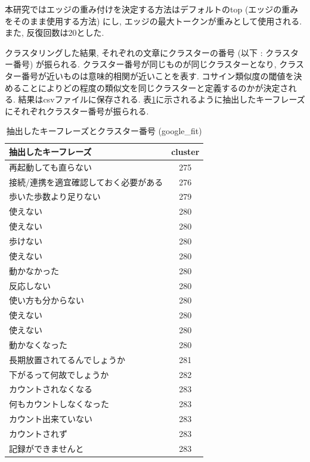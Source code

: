 本研究ではエッジの重み付けを決定する方法はデフォルトのtop (エッジの重みをそのまま使用する方法) にし, エッジの最大トークンが重みとして使用される. また, 反復回数は20とした. 

クラスタリングした結果, それぞれの文章にクラスターの番号 (以下 : クラスター番号) が振られる. クラスター番号が同じものが同じクラスターとなり, クラスター番号が近いものは意味的相関が近いことを表す. コサイン類似度の閾値を決めることによりどの程度の類似文を同じクラスターと定義するのかが決定される. 
結果はcsvファイルに保存される. 表\ref{tb:clustering}に示されるように抽出したキーフレーズにそれぞれクラスター番号が振られる. 

\begin{table}[H]
  \caption{抽出したキーフレーズとクラスター番号 (google\_fit) }
  \label{tb:clustering}
  \begin{center}
  \begin{tabularx}{\linewidth}{X|c}
    \hline
    抽出したキーフレーズ&cluster\\\hline\hline
    再起動しても直らない&275\\\hline
    接続/連携を適宜確認しておく必要がある&276\\\hline
    歩いた歩数より足りない&279\\\hline
    使えない&280\\\hline
    使えない&280\\\hline
    歩けない&280\\\hline
    使えない&280\\\hline
    動かなかった&280\\\hline
    反応しない&280\\\hline
    使い方も分からない&280\\\hline
    使えない&280\\\hline
    使えない&280\\\hline
    動かなくなった&280\\\hline
    長期放置されてるんでしょうか&281\\\hline
    下がるって何故でしょうか&282\\\hline
    カウントされなくなる&283\\\hline
    何もカウントしなくなった&283\\\hline
    カウント出来ていない&283\\\hline
    カウントされず&283\\\hline
    記録ができませんと&283\\\hline
  \end{tabularx}\end{center}
\end{table}

